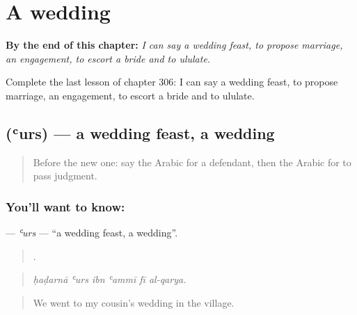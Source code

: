 
\chapter{A wedding}
\label{ch:ar-a-wedding}

\begin{chapteropening}
\textbf{By the end of this chapter:} \emph{I can say a wedding feast, to propose marriage, an engagement, to escort a bride and to ululate.}

Complete the last lesson of chapter 306: I can say a wedding feast, to propose marriage, an engagement, to escort a bride and to ululate.
\end{chapteropening}

\section[\texorpdfstring{\ar{عرس} (ʿurs)}{عرس (ʿurs)}]{ (ʿurs) — a wedding feast, a wedding}

\label{lesson:AR-C306-urs}



\begin{quote}
Before the new one: say the Arabic for a defendant, then the Arabic for to pass judgment.
\end{quote}

\subsection*{You'll want to know: }
\textbf{} — \emph{ʿurs} — \textquotedblleft{}a wedding feast, a wedding\textquotedblright{}.

\begin{quote}
     .
\end{quote}

\begin{quote}
\emph{ḥaḍarnā ʿurs ibn ʿammī fī al-qarya.}
\end{quote}

\begin{quote}
We went to my cousin’s wedding in the village.
\end{quote}

